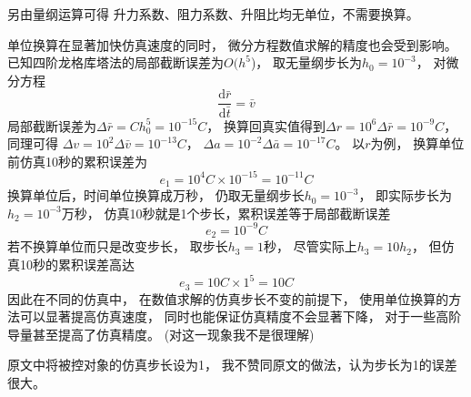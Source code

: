 另由量纲运算可得
升力系数、阻力系数、升阻比均无单位，不需要换算。

单位换算在显著加快仿真速度的同时，
微分方程数值求解的精度也会受到影响。
已知四阶龙格库塔法的局部截断误差为$O(h^5$)\cite{mqingyang2019}，
取无量纲步长为$h_0=10^{-3}$，
对微分方程
\[\frac{\text{d}\bar{r}}{\text{d}\bar{t}}=\bar{v}\]
局部截断误差为$\Delta\bar{r}=Ch_0^5=10^{-15}C$，
换算回真实值得到$\Delta r=10^6\Delta\bar{r}=10^{-9}C$，
同理可得
$\Delta v=10^2\Delta\bar{v}=10^{-13}C$，
$\Delta a=10^{-2}\Delta\bar{a}=10^{-17}C$。
以$r$为例，
换算单位前仿真10秒的累积误差为
\[e_1=10^4C\times 10^{-15}=10^{-11}C\]
换算单位后，时间单位换算成万秒，
仍取无量纲步长$h_0=10^{-3}$，
即实际步长为$h_2=10^{-3}$万秒，
仿真10秒就是1个步长，累积误差等于局部截断误差
\[e_2=10^{-9}C\]
若不换算单位而只是改变步长，
取步长$h_3=1$秒，
尽管实际上$h_3=10h_2$，
但仿真10秒的累积误差高达
\[e_3=10C\times 1^5=10C\]
因此在不同的仿真中，
在数值求解的仿真步长不变的前提下，
使用单位换算的方法可以显著提高仿真速度，
同时也能保证仿真精度不会显著下降，
对于一些高阶导量甚至提高了仿真精度。
(对这一现象我不是很理解)

原文\cite{dqingyuan2019}中将被控对象的仿真步长设为1，
我不赞同原文的做法，认为步长为1的误差很大。
